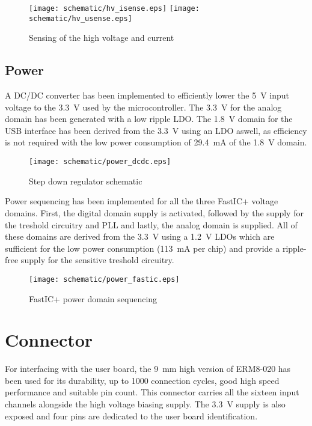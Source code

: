 \FloatBarrier
\begin{figure}[htp!]
    \centering
    \texttt{[image: schematic/hv\_isense.eps]}
    \texttt{[image: schematic/hv\_usense.eps]}
    \caption{Sensing of the high voltage and current}
    \label{fig:schem_hvsense}
\end{figure}
\FloatBarrier

\subsection{Power}
A DC/DC converter has been implemented to efficiently lower the \SI{5}{\volt} input voltage to the \SI{3.3}{\volt} used by the microcontroller. The \SI{3.3}{\volt} for the analog domain has been generated with a low ripple LDO. The \SI{1.8}{\volt} domain for the USB interface has been derived from the \SI{3.3}{\volt} using an LDO aswell, as efficiency is not required with the low power consumption of \SI{29.4}{\milli\ampere} of the \SI{1.8}{\volt} domain.
\FloatBarrier
\begin{figure}[htp!]
    \centering
    \texttt{[image: schematic/power\_dcdc.eps]}
    \caption{Step down regulator schematic}
    \label{fig:schem_dcdc}
\end{figure}
\FloatBarrier

Power sequencing has been implemented for all the three FastIC+ voltage domains. First, the digital domain supply is activated, followed by the supply for the treshold circuitry and PLL and lastly, the analog domain is supplied. All of these domains are derived from the \SI{3.3}{\volt} using a \SI{1.2}{\volt} LDOs which are sufficient for the low power consumption (\SI{113}{\milli\ampere} per chip) and provide a ripple-free supply for the sensitive treshold circuitry.

\FloatBarrier
\begin{figure}[htp!]
    \centering
    \texttt{[image: schematic/power\_fastic.eps]}
    \caption{FastIC+ power domain sequencing}
    \label{fig:schem_fastic_power}
\end{figure}
\FloatBarrier

\section{Connector}
For interfacing with the user board, the \SI{9}{\milli\meter} high version of ERM8-020 has been used for its durability, up to 1000 connection cycles, good high speed performance and suitable pin count. This connector carries all the sixteen input channels alongside the high voltage biasing supply. The \SI{3.3}{\volt} supply is also exposed and four pins are dedicated to the user board identification.
%
